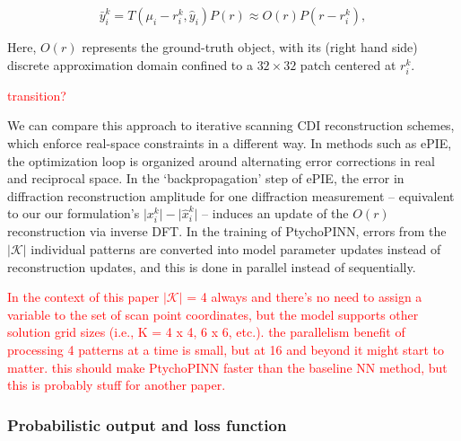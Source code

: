 \documentclass[sn-mathphys]{sn-jnl}%
\theoremstyle{thmstyleone}%
\theoremstyle{thmstyletwo}%
\theoremstyle{thmstylethree}%
\begin{document}
$$
\bar{y}_i^k = T(\mu_i - r_i^k, \hat{y}_i) P(r) \approx O(r) P(r - r_i^k),\label{eq:2}
$$

Here, $O(r)$ represents the ground-truth object, with its (right hand side) discrete approximation domain confined to a $32 \times 32$ patch centered at $r_i^k$.

\textcolor{red}{transition?}

We can compare this approach to iterative scanning CDI reconstruction schemes, which enforce real-space constraints in a different way. In methods such as ePIE, the optimization loop is organized around alternating error corrections in real and reciprocal space. In the `backpropagation' step of ePIE, the error in diffraction reconstruction amplitude for one diffraction measurement -- equivalent to our our formulation's $\lvert x_i^k \rvert - \lvert \hat{x}_i^k \rvert $ -- induces an update of the $O(r)$ reconstruction via inverse DFT. In the training of PtychoPINN, errors from the $\vert \mathcal{K} \vert$ individual patterns are converted into model parameter updates instead of reconstruction updates, and this is done in parallel instead of sequentially.

\textcolor{red}{In the context of this paper $\vert \mathcal{K} \vert$ = 4 always and there's no need to assign a variable to the set of scan point coordinates, but the model supports other solution grid sizes (i.e., K =  4 x 4, 6 x 6, etc.). the parallelism benefit of processing 4 patterns at a time is small, but at 16 and beyond it might start to matter. this should make PtychoPINN faster than the baseline NN method, but this is probably stuff for another paper.}






\subsubsection{Probabilistic output and loss function}
\end{document}
